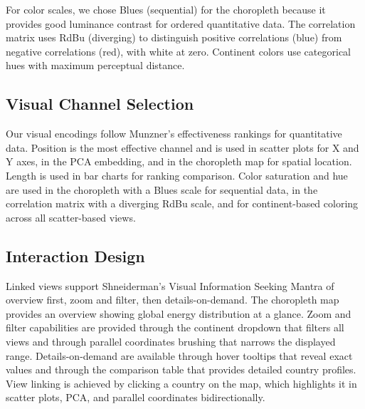 \documentclass[conference]{IEEEtran}
\begin{document}
{For color scales, we chose Blues (sequential) for the choropleth because it provides good luminance contrast for ordered quantitative data. The correlation matrix uses RdBu (diverging) to distinguish positive correlations (blue) from negative correlations (red), with white at zero. Continent colors use categorical hues with maximum perceptual distance.
}

\subsection{Visual Channel Selection}
Our visual encodings follow Munzner's effectiveness rankings for quantitative data. Position is the most effective channel and is used in scatter plots for X and Y axes, in the PCA embedding, and in the choropleth map for spatial location. Length is used in bar charts for ranking comparison. Color saturation and hue are used in the choropleth with a Blues scale for sequential data, in the correlation matrix with a diverging RdBu scale, and for continent-based coloring across all scatter-based views.

\subsection{Interaction Design}
Linked views support Shneiderman's Visual Information Seeking Mantra of overview first, zoom and filter, then details-on-demand. The choropleth map provides an overview showing global energy distribution at a glance. Zoom and filter capabilities are provided through the continent dropdown that filters all views and through parallel coordinates brushing that narrows the displayed range. Details-on-demand are available through hover tooltips that reveal exact values and through the comparison table that provides detailed country profiles. View linking is achieved by clicking a country on the map, which highlights it in scatter plots, PCA, and parallel coordinates bidirectionally.
\end{document}
